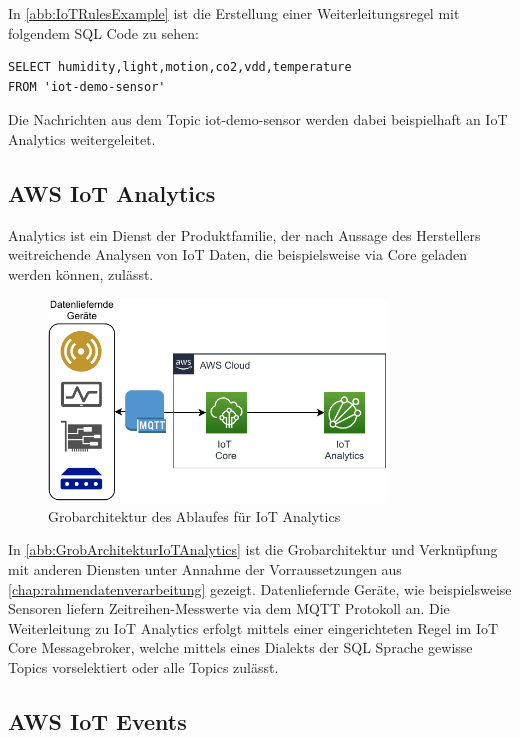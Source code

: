 In \autoref{abb:IoTRulesExample} ist die Erstellung einer Weiterleitungsregel mit folgendem SQL Code zu sehen:
\lstset{language=SQL} 
\begin{lstlisting}
SELECT humidity,light,motion,co2,vdd,temperature 
FROM 'iot-demo-sensor'
\end{lstlisting}
Die Nachrichten aus dem Topic iot-demo-sensor werden dabei beispielhaft an IoT Analytics weitergeleitet.

\subsection{AWS IoT Analytics} \label{productselection:iotanalytics}
\AWSIOT Analytics ist ein Dienst der \AWSIOT Produktfamilie, der nach Aussage des Herstellers weitreichende Analysen von \ac{IoT} Daten, die beispielsweise via \AWSIOT Core geladen werden können, zulässt.
\begin{figure}[H]
\centering
\includegraphics[width=0.8\textwidth]{graphics/IoT-Analytics-general.pdf}
\caption{Grobarchitektur des Ablaufes für IoT Analytics}
\label{abb:GrobArchitekturIoTAnalytics}
\end{figure}
In \autoref{abb:GrobArchitekturIoTAnalytics} ist die Grobarchitektur und Verknüpfung mit anderen Diensten unter Annahme der Vorraussetzungen aus \autoref{chap:rahmendatenverarbeitung} gezeigt. Datenliefernde Geräte, wie beispielsweise Sensoren liefern Zeitreihen-Messwerte via dem \ac{MQTT} Protokoll an. Die Weiterleitung zu IoT Analytics erfolgt mittels einer eingerichteten Regel im \ac{IoT} Core Messagebroker, welche mittels eines Dialekts der SQL Sprache gewisse Topics vorselektiert oder alle Topics zulässt.

\subsection{AWS IoT Events}

